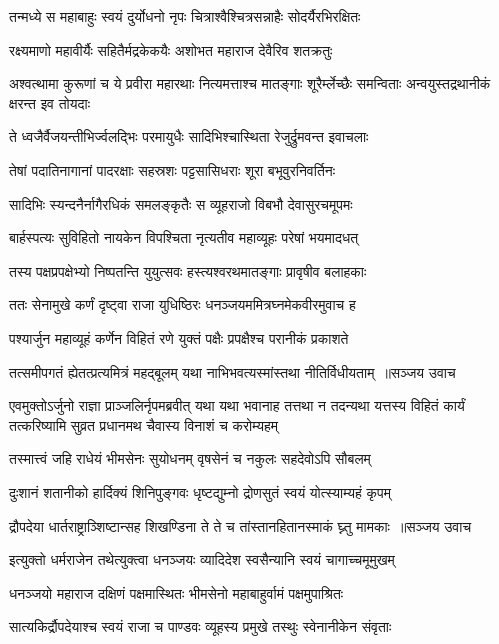 \twolineshloka
{तन्मध्ये स महाबाहुः स्वयं दुर्योधनो नृपः}
{चित्राश्वैश्चित्रसन्नाहैः सोदर्यैरभिरक्षितः}


\twolineshloka
{रक्ष्यमाणो महावीर्यैः सहितैर्मद्रकेकयैः}
{अशोभत महाराज देवैरिव शतक्रतुः}


\threelineshloka
{अश्वत्थामा कुरूणां च ये प्रवीरा महारथाः}
{नित्यमत्ताश्च मातङ्गाः शूरैर्म्लेच्छैः समन्विताः}
{अन्वयुस्तद्रथानीकं क्षरन्त इव तोयदाः}


\twolineshloka
{ते ध्वजैर्वैजयन्तीभिर्ज्वलद्भिः परमायुधैः}
{सादिभिश्चास्थिता रेजुर्द्रुमवन्त इवाचलाः}


\twolineshloka
{तेषां पदातिनागानां पादरक्षाः सहस्रशः}
{पट्टसासिधराः शूरा बभूवुरनिवर्तिनः}


\twolineshloka
{सादिभिः स्यन्दनैर्नागैरधिकं समलङ्कृतैः}
{स व्यूहराजो विबभौ देवासुरचमूपमः}


\twolineshloka
{बार्हस्पत्यः सुविहितो नायकेन विपश्चिता}
{नृत्यतीव महाव्यूहः परेषां भयमादधत्}


\twolineshloka
{तस्य पक्षप्रपक्षेभ्यो निष्पतन्ति युयुत्सवः}
{हस्त्यश्वरथमातङ्गाः प्रावृषीव बलाहकाः}


\twolineshloka
{ततः सेनामुखे कर्णं दृष्ट्वा राजा युधिष्ठिरः}
{धनञ्जयममित्रघ्नमेकवीरमुवाच ह}


\twolineshloka
{पश्यार्जुन महाव्यूहं कर्णेन विहितं रणे}
{युक्तं पक्षैः प्रपक्षैश्च परानीकं प्रकाशते}


\threelineshloka
{तत्समीपगतं ह्येतत्प्रत्यमित्रं महद्बूलम्}
{यथा नाभिभवत्यस्मांस्तथा नीतिर्विधीयताम् ॥सञ्जय उवाच}
{}


एवमुक्तोऽर्जुनो राज्ञा प्राञ्जलिर्नृपमब्रवीत्
\threelineshloka
{यथा यथा भवानाह तत्तथा न तदन्यथा}
{यत्तस्य विहितं कार्यं तत्करिष्यामि सुव्रत}
{प्रधानमथ चैवास्य विनाशं च करोम्यहम्}


\twolineshloka
{तस्मात्त्वं जहि राधेयं भीमसेनः सुयोधनम्}
{वृषसेनं च नकुलः सहदेवोऽपि सौबलम्}


\twolineshloka
{दुःशानं शतानीको हार्दिक्यं शिनिपुङ्गवः}
{धृष्टद्युम्नो द्रोणसुतं स्वयं योत्स्याम्यहं कृपम्}


\threelineshloka
{द्रौपदेया धार्तराष्ट्राञ्शिष्टान्सह शिखण्डिना}
{ते ते च तांस्तानहितानस्माकं घ्न्तु मामकाः ॥सञ्जय उवाच}
{}


\twolineshloka
{इत्युक्तो धर्मराजेन तथेत्युक्त्वा धनञ्जयः}
{व्यादिदेश स्वसैन्यानि स्वयं चागाच्चमूमुखम्}


\twolineshloka
{धनञ्जयो महाराज दक्षिणं पक्षमास्थितः}
{भीमसेनो महाबाहुर्वामं पक्षमुपाश्रितः}


\twolineshloka
{सात्यकिर्द्रौपदेयाश्च स्वयं राजा च पाण्डवः}
{व्यूहस्य प्रमुखे तस्थुः स्वेनानीकेन संवृताः}


